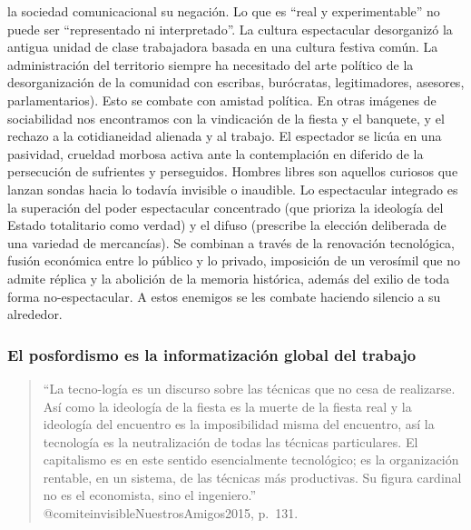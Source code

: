 \documentclass[
]{article}
\begin{document}
la sociedad comunicacional su negación. Lo que es ``real y
experimentable'' no puede ser ``representado ni interpretado''. La
cultura espectacular desorganizó la antigua unidad de clase trabajadora
basada en una cultura festiva común. La administración del territorio
siempre ha necesitado del arte político de la desorganización de la
comunidad con escribas, burócratas, legitimadores, asesores,
parlamentarios). Esto se combate con amistad política. En otras imágenes
de sociabilidad nos encontramos con la vindicación de la fiesta y el
banquete, y el rechazo a la cotidianeidad alienada y al trabajo. El
espectador se licúa en una pasividad, crueldad morbosa activa ante la
contemplación en diferido de la persecución de sufrientes y perseguidos.
Hombres libres son aquellos curiosos que lanzan sondas hacia lo todavía
invisible o inaudible. Lo espectacular integrado es la superación del
poder espectacular concentrado (que prioriza la ideología del Estado
totalitario como verdad) y el difuso (prescribe la elección deliberada
de una variedad de mercancías). Se combinan a través de la renovación
tecnológica, fusión económica entre lo público y lo privado, imposición
de un verosímil que no admite réplica y la abolición de la memoria
histórica, además del exilio de toda forma no-espectacular. A estos
enemigos se les combate haciendo silencio a su alrededor.

\hypertarget{el-posfordismo-es-la-informatizaciuxf3n-global-del-trabajo}{%
\subsubsection{El posfordismo es la informatización global del
trabajo}\label{el-posfordismo-es-la-informatizaciuxf3n-global-del-trabajo}}

\begin{quote}
``La tecno-logía es un discurso sobre las técnicas que no cesa de
realizarse. Así como la ideología de la fiesta es la muerte de la fiesta
real y la ideología del encuentro es la imposibilidad misma del
encuentro, así la tecnología es la neutralización de todas las técnicas
particulares. El capitalismo es en este sentido esencialmente
tecnológico; es la organización rentable, en un sistema, de las técnicas
más productivas. Su figura cardinal no es el economista, sino el
ingeniero.'' @comiteinvisibleNuestrosAmigos2015, p.~131.
\end{quote}
\end{document}
